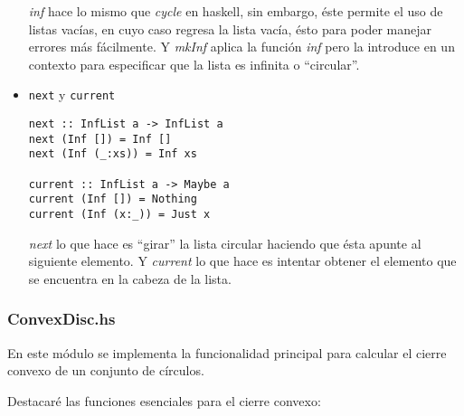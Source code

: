 \documentclass[12pt]{article}
\begin{document}
\begin{itemize}
  \textit{inf} hace lo mismo que \textit{cycle} en haskell, sin embargo, éste permite el uso de listas vacías, en cuyo caso regresa la lista vacía, ésto para poder manejar errores más fácilmente. Y \textit{mkInf} aplica la función \textit{inf} pero la introduce en un contexto para especificar que la lista es infinita o ``circular''.

\item \texttt{next} y \texttt{current}

  \begin{verbatim}
next :: InfList a -> InfList a
next (Inf []) = Inf []
next (Inf (_:xs)) = Inf xs

current :: InfList a -> Maybe a
current (Inf []) = Nothing
current (Inf (x:_)) = Just x
  \end{verbatim}
  
\textit{next} lo que hace es ``girar'' la lista circular haciendo que ésta apunte al siguiente elemento. Y \textit{current} lo que hace es intentar obtener el elemento que se encuentra en la cabeza de la lista.
  
\end{itemize}

\subsubsection*{ConvexDisc.hs}

En este módulo se implementa la funcionalidad principal para calcular el cierre convexo de un conjunto de círculos.

Destacaré las funciones esenciales para el cierre convexo:
\end{document}
